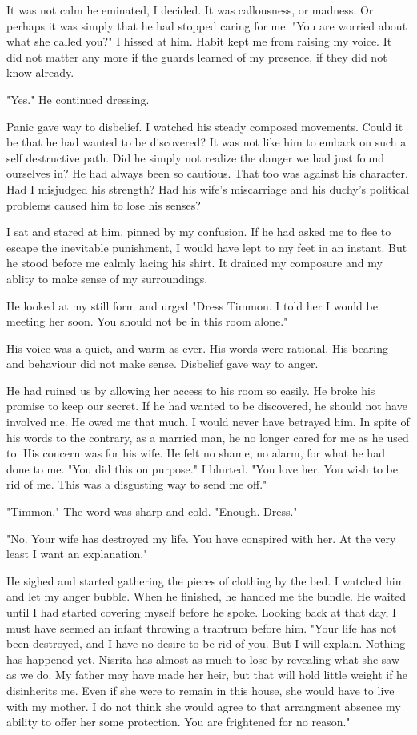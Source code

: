 \documentclass{article}
\begin{document}
It was not calm he eminated, I decided. It was callousness, or madness. Or perhaps it was simply that he had stopped caring for me. "You are worried about what she called you?" I hissed at him. Habit kept me from raising my voice. It did not matter any more if the guards learned of my presence, if they did not know already.

"Yes." He continued dressing.

Panic gave way to disbelief. I watched his steady composed movements. Could it be that he had wanted to be discovered? It was not like him to embark on such a self destructive path. Did he simply not realize the danger we had just found ourselves in? He had always been so cautious. That too was against his character. Had I misjudged his strength? Had his wife's miscarriage and his duchy's political problems caused him to lose his senses? 

I sat and stared at him, pinned by my confusion. If he had asked me to flee to escape the inevitable punishment, I would have lept to my feet in an instant. But he stood before me calmly lacing his shirt. It drained my composure and my ablity to make sense of my surroundings.

He looked at my still form and urged "Dress Timmon. I told her I would be meeting her soon. You should not be in this room alone."

His voice was a quiet, and warm as ever. His words were rational. His bearing and behaviour did not make sense. Disbelief gave way to anger. 

He had ruined us by allowing her access to his room so easily. He broke his promise to keep our secret. If he had wanted to be discovered, he should not have involved me. He owed me that much. I would never have betrayed him. In spite of his words to the contrary, as a married man, he no longer cared for me as he used to. His concern was for his wife. He felt no shame, no alarm, for what he had done to me. "You did this on purpose." I blurted. "You love her. You wish to be rid of me. This was a disgusting way to send me off."

"Timmon." The word was sharp and cold. "Enough. Dress."

"No. Your wife has destroyed my life. You have conspired with her. At the very least I want an explanation."

He sighed and started gathering the pieces of clothing by the bed. I watched him and let my anger bubble. When he finished, he handed me the bundle. He waited until I had started covering myself before he spoke. Looking back at that day, I must have seemed an infant throwing a trantrum before him. "Your life has not been destroyed, and I have no desire to be rid of you. But I will explain. Nothing has happened yet. Nisrita has almost as much to lose by revealing what she saw as we do. My father may have made her heir, but that will hold little weight if he disinherits me. Even if she were to remain in this house, she would have to live with my mother. I do not think she would agree to that arrangment absence my ability to offer her some protection. You are frightened for no reason."
\end{document}
